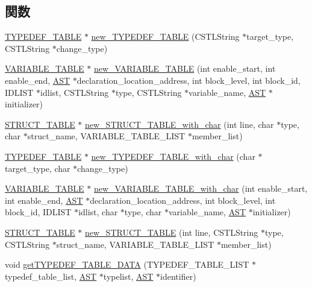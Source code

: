 \subsection*{関数}
\begin{DoxyCompactItemize}
\item 
\hyperlink{structtypedef__table}{TYPEDEF\_\-TABLE} $\ast$ \hyperlink{Synbol_8h_aff3bac744ce12f04e06889fa7eca475b}{new\_\-TYPEDEF\_\-TABLE} (CSTLString $\ast$target\_\-type, CSTLString $\ast$change\_\-type)
\item 
\hyperlink{structvariable__table}{VARIABLE\_\-TABLE} $\ast$ \hyperlink{Synbol_8h_ad6f6de1ea1d321db508f2c338ab54a50}{new\_\-VARIABLE\_\-TABLE} (int enable\_\-start, int enable\_\-end, \hyperlink{structabstract__syntax__tree}{AST} $\ast$declaration\_\-location\_\-address, int block\_\-level, int block\_\-id, IDLIST $\ast$idlist, CSTLString $\ast$type, CSTLString $\ast$variable\_\-name, \hyperlink{structabstract__syntax__tree}{AST} $\ast$initializer)
\item 
\hyperlink{structstruct__table}{STRUCT\_\-TABLE} $\ast$ \hyperlink{Synbol_8h_aa95ef26c2c998337b7e10ede885869b9}{new\_\-STRUCT\_\-TABLE\_\-with\_\-char} (int line, char $\ast$type, char $\ast$struct\_\-name, VARIABLE\_\-TABLE\_\-LIST $\ast$member\_\-list)
\item 
\hyperlink{structtypedef__table}{TYPEDEF\_\-TABLE} $\ast$ \hyperlink{Synbol_8h_a2666e0087dc2d4475a0d342a216a6f5e}{new\_\-TYPEDEF\_\-TABLE\_\-with\_\-char} (char $\ast$target\_\-type, char $\ast$change\_\-type)
\item 
\hyperlink{structvariable__table}{VARIABLE\_\-TABLE} $\ast$ \hyperlink{Synbol_8h_a0625ef2500d1f120f7b530c0c93d00b8}{new\_\-VARIABLE\_\-TABLE\_\-with\_\-char} (int enable\_\-start, int enable\_\-end, \hyperlink{structabstract__syntax__tree}{AST} $\ast$declaration\_\-location\_\-address, int block\_\-level, int block\_\-id, IDLIST $\ast$idlist, char $\ast$type, char $\ast$variable\_\-name, \hyperlink{structabstract__syntax__tree}{AST} $\ast$initializer)
\item 
\hyperlink{structstruct__table}{STRUCT\_\-TABLE} $\ast$ \hyperlink{Synbol_8h_aa0bb5baf5c427f56c23a7a945dc39859}{new\_\-STRUCT\_\-TABLE} (int line, CSTLString $\ast$type, CSTLString $\ast$struct\_\-name, VARIABLE\_\-TABLE\_\-LIST $\ast$member\_\-list)
\item 
void \hyperlink{Synbol_8h_ac57e5e84ec4979512c4fc20c9e1b9135}{getTYPEDEF\_\-TABLE\_\-DATA} (TYPEDEF\_\-TABLE\_\-LIST $\ast$typedef\_\-table\_\-list, \hyperlink{structabstract__syntax__tree}{AST} $\ast$typelist, \hyperlink{structabstract__syntax__tree}{AST} $\ast$identifier)

\end{DoxyCompactItemize}
